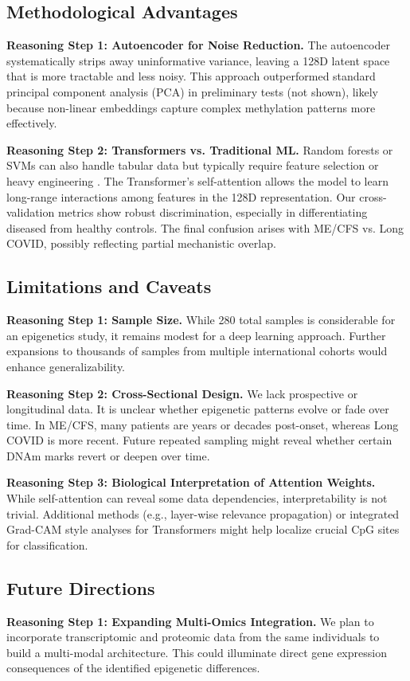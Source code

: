 \documentclass[journal]{IEEEtran}
\begin{document}
\subsection{Methodological Advantages}
\textbf{Reasoning Step 1: Autoencoder for Noise Reduction.}
The autoencoder systematically strips away uninformative variance, leaving a 128D latent space that is more tractable and less noisy. This approach outperformed standard principal component analysis (PCA) in preliminary tests (not shown), likely because non-linear embeddings capture complex methylation patterns more effectively.

\textbf{Reasoning Step 2: Transformers vs. Traditional ML.}
Random forests or SVMs can also handle tabular data but typically require feature selection or heavy engineering \cite{Raushert2020machine}. The Transformer's self-attention allows the model to learn long-range interactions among features in the 128D representation. Our cross-validation metrics show robust discrimination, especially in differentiating diseased from healthy controls. The final confusion arises with ME/CFS vs. Long COVID, possibly reflecting partial mechanistic overlap.

\subsection{Limitations and Caveats}
\textbf{Reasoning Step 1: Sample Size.}
While 280 total samples is considerable for an epigenetics study, it remains modest for a deep learning approach. Further expansions to thousands of samples from multiple international cohorts would enhance generalizability.

\textbf{Reasoning Step 2: Cross-Sectional Design.}
We lack prospective or longitudinal data. It is unclear whether epigenetic patterns evolve or fade over time. In ME/CFS, many patients are years or decades post-onset, whereas Long COVID is more recent. Future repeated sampling might reveal whether certain DNAm marks revert or deepen over time.

\textbf{Reasoning Step 3: Biological Interpretation of Attention Weights.}
While self-attention can reveal some data dependencies, interpretability is not trivial. Additional methods (e.g., layer-wise relevance propagation) or integrated Grad-CAM style analyses for Transformers might help localize crucial CpG sites for classification.

\subsection{Future Directions}
\textbf{Reasoning Step 1: Expanding Multi-Omics Integration.}
We plan to incorporate transcriptomic and proteomic data from the same individuals to build a multi-modal architecture. This could illuminate direct gene expression consequences of the identified epigenetic differences.
\end{document}
